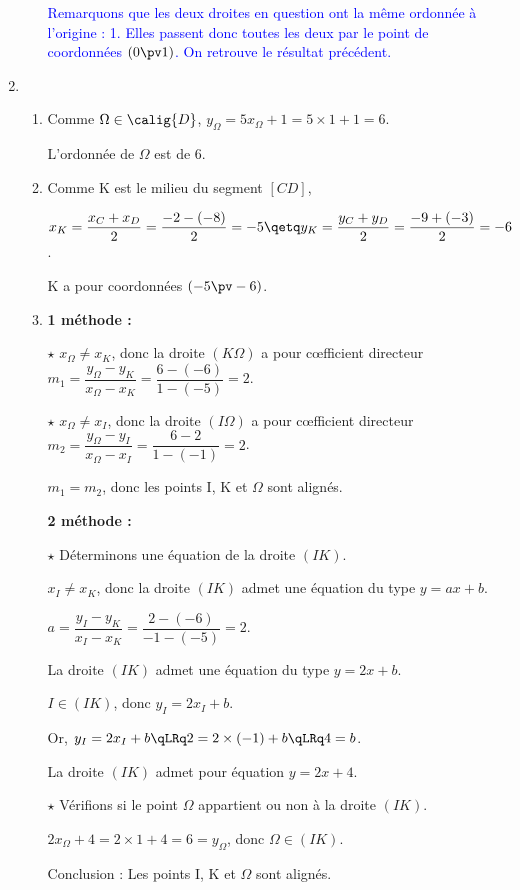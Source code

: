 \documentclass[10pt,french]{article}
\begin{document}
\begin{enumerate}[label=\arabic*.]
\begin{enumerate}[label=\alph*)]
	\textcolor{blue}{Remarquons que les deux droites en question ont la même ordonnée à l'origine : 1. Elles passent donc toutes les deux par le point de coordonnées $(0\pv 1)$. On retrouve le résultat précédent.}
	\end{enumerate}

\item
	\begin{enumerate}[label=\alph*)]
	\item Comme $\Omega\in \calig{D}$, $y_{\Omega}=5x_{\Omega}+1=5\times 1+1=6$.
	
	L'ordonnée de $\Omega$ est de 6.
	
	\item Comme K est le milieu du segment $[CD]$,
	
	$x_K=\dfrac{x_C+x_D}{2}=\dfrac{-2-(-8)}{2}=-5\qetq y_K=\dfrac{y_C+y_D}{2}=\dfrac{-9+(-3)}{2}=-6$.
	
	K a pour coordonnées $(-5\pv -6)$.
	
	\item %
	\textbf{1 méthode :}
	
	$\star$ $x_{\Omega}\neq x_K$, donc la droite $(K\Omega)$ a pour c\oe{}fficient directeur $m_1=\dfrac{y_\Omega-y_K}{x_{\Omega}-x_K}=\dfrac{6-(-6)}{1-(-5)}=2$.
	
	$\star$ $x_{\Omega}\neq x_I$, donc la droite $(I\Omega)$ a pour c\oe{}fficient directeur $m_2=\dfrac{y_\Omega-y_I}{x_{\Omega}-x_I}=\dfrac{6-2}{1-(-1)}=2$.
	
	$m_1=m_2$, donc les points I, K et $\Omega$ sont alignés.
	
	\textbf{2 méthode :}
	
	$\star$ Déterminons une équation de la droite $(IK)$.
	
	$x_I\neq x_K$, donc la droite $(IK)$ admet une équation du type $y=ax+b$.
	
	$a=\dfrac{y_I-y_K}{x_I-x_K}=\dfrac{2-(-6)}{-1-(-5)}=2$.
	
	La droite $(IK)$ admet une équation du type $y=2x+b$.
	
	$I\in (IK)$, donc $y_I=2x_I+b$.
	
	Or, $y_I=2x_I+b\qLRq 2=2\times (-1)+b\qLRq 4=b$.
	
	La droite $(IK)$ admet pour équation $y=2x+4$.
	
	$\star$ Vérifions si le point $\Omega$ appartient ou non à la droite $(IK)$.
	
	$2x_{\Omega}+4=2\times 1+4=6=y_{\Omega}$, donc $\Omega\in (IK)$.
	
	Conclusion : Les points I, K et $\Omega$ sont alignés.
	\end{enumerate}
\end{enumerate}
\end{document}
